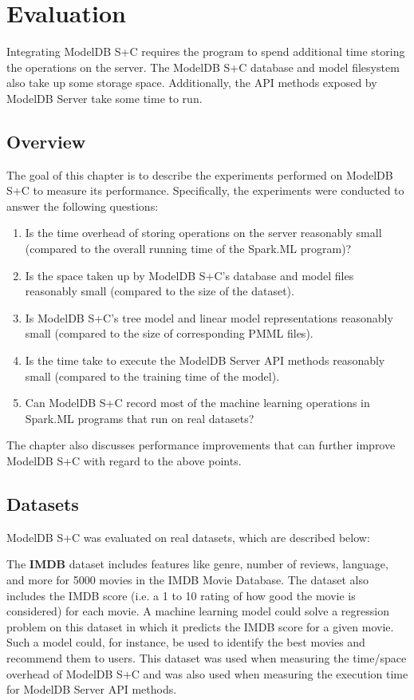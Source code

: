 \chapter{Evaluation}
Integrating ModelDB S+C requires the program to spend additional time storing the
operations on the server. The ModelDB S+C database and model filesystem also
take up some storage space. Additionally, the API methods exposed by ModelDB Server
take some time to run.

\section{Overview}
The goal of this chapter is to describe the experiments performed on ModelDB S+C
to measure its performance. Specifically, the experiments were conducted to
answer the following questions:

\begin{enumerate}
\item Is the time overhead of storing operations on the server reasonably small (compared to
the overall running time of the Spark.ML program)?
\item Is the space taken up by ModelDB S+C's database and model files reasonably small (compared
to the size of the dataset).
\item Is ModelDB S+C's tree model and linear model representations reasonably small (compared 
to the size of corresponding PMML files).
\item Is the time take to execute the ModelDB Server API methods reasonably small (compared
to the training time of the model).
\item Can ModelDB S+C record most of the machine learning operations in Spark.ML programs
that run on real datasets?
\end{enumerate}

The chapter also discusses performance improvements that can further improve ModelDB S+C with
regard to the above points.

\section{Datasets}
ModelDB S+C was evaluated on real datasets, which are described below:

The \textbf{IMDB} dataset \cite{imdb} includes features like genre, number of
reviews, language, and more for 5000 movies in the IMDB Movie Database. The dataset
also includes the IMDB score (i.e. a 1 to 10 rating of how good the movie is considered)
for each movie. A machine learning model could solve a regression problem on this
dataset in which it predicts the IMDB score for a given movie. Such a model could, for instance,
be used to identify the best movies and recommend them to users. This dataset
was used when measuring the time/space overhead of ModelDB S+C and was also used
when measuring the execution time for ModelDB Server API methods.

